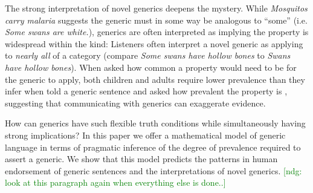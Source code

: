 \documentclass[10pt,letterpaper]{article}
\newcommand{\ndg}[1]{\textcolor{Green}{[ndg: #1]}}
\begin{document}

The strong interpretation of novel generics deepens the mystery.
While \emph{Mosquitos carry malaria} suggests the generic must in some way be analogous to ``some'' (i.e. \emph{Some swans are white.}), generics are often interpreted as implying the property is widespread within the kind:
Listeners often interpret a novel generic as applying to \emph{nearly all} of a category \cite{Gelman2002} (compare \emph{Some swans have hollow bones} to \emph{Swans have hollow bones}).
When asked how common a property would need to be for the generic to apply, both children and adults require lower prevalence than they infer when told a generic sentence and asked how prevalent the property is \cite{Cimpian2010, Brandone2014}, suggesting that communicating with generics can exaggerate evidence.

How can generics have such flexible truth conditions while simultaneously having strong implications?
In this paper we offer a mathematical model of generic language in terms of pragmatic inference of the degree of prevalence required to assert a generic.  
We show that this model predicts the patterns in human endorsement of generic sentences and the interpretations of novel generics. \ndg{look at this paragraph again when everything else is done..}


\end{document}

